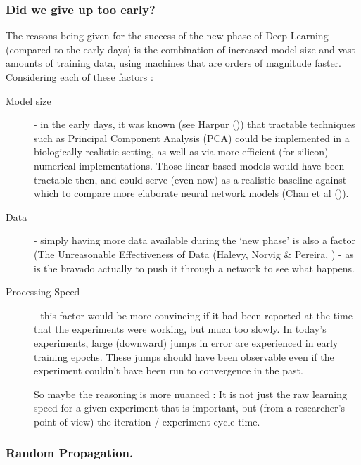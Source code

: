 \documentclass[citeauthoryear]{llncs}
\begin{document}
\subsubsection*{Did we give up too early?}
 
The reasons being given for the success of the new phase of Deep Learning 
(compared to the early days) is the combination of increased model size and 
vast amounts of training data, using machines that are orders of magnitude faster.  
Considering each of these factors :

\begin{description}

\item[Model size] - in the early days, it was known (see Harpur (\cite{harpur-thesis})) 
that tractable techniques such as Principal Component Analysis (PCA) could be implemented 
in a biologically realistic setting, as well as via more efficient (for silicon) numerical implementations.  
Those linear-based models would have been tractable then, 
and could serve (even now) as a realistic baseline against which to compare 
more elaborate neural network models (Chan et al (\cite{PCAnet})).

\item[Data] - simply having more data available during the `new phase' 
is also a factor (The Unreasonable Effectiveness of Data (Halevy, Norvig \& Pereira, \cite{norvig-UnreasonableEffectivenessOfData})
- as is the bravado actually to push it through a network to see what happens.

\item[Processing Speed] - this factor would be more convincing if it had been reported at the time 
that the experiments were working, but much too slowly.  
In today's experiments, large (downward) jumps in error are experienced in early training epochs.  
These jumps should have been observable even if the experiment couldn't have 
been run to convergence in the past.  

So maybe the reasoning is more nuanced : It is not just the raw learning speed 
for a given experiment that is important, but 
(from a researcher's point of view) the iteration / experiment cycle time.

\end{description}


\subsubsection*{Random Propagation.}
\end{document}
